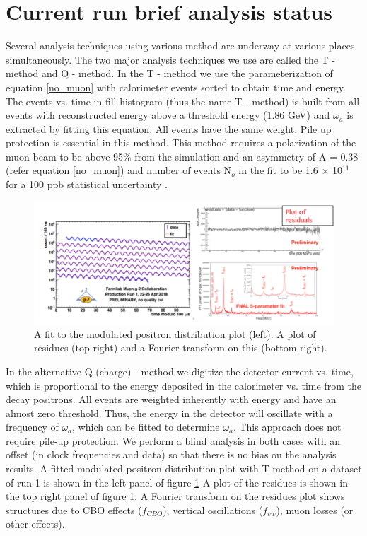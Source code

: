 \documentclass[journal,article,submit,moreauthors,pdftex,10pt,a4paper]{Definitions/mdpi}
\begin{document}
\section{Current run brief analysis status}
Several analysis techniques using various method are underway at various places simultaneously. 
The two major analysis techniques we use are called the T - method and Q - method. 
In the T - method we use the parameterization of equation \ref{no_muon} with calorimeter events 
sorted to obtain time and energy. The events vs. time-in-fill histogram (thus the name T - method) 
is built from all events with reconstructed energy above a threshold energy (1.86 GeV) and 
$\omega_a$ is extracted by fitting this equation. All events have the same weight. 
Pile up protection is essential in this method. 
This method requires a polarization of the muon beam to be above 95\% from the simulation 
and an asymmetry of A = 0.38 (refer equation \ref{no_muon}) and number of events N$_{o}$
in the fit to be 1.6 $\times$ 10$^{11}$ for a 100 ppb statistical uncertainty \cite{TDR}. 
\begin{figure}[H]
\centering
\includegraphics[width=13 cm]{analysis.png}
\caption{\label{fig10} A fit to the modulated positron distribution plot (left). A plot of residues (top right) and a Fourier transform on this (bottom right).}
\end{figure} 

In the alternative Q (charge) - method we digitize the detector current vs. time, 
which is proportional to the energy deposited in the calorimeter
vs. time from the decay positrons. All events are weighted inherently with energy 
and have an almost zero threshold. Thus, the energy in the detector will oscillate with a frequency of $\omega_a$, 
which can be fitted to determine $\omega_a$. This approach does not require pile-up protection. 
We perform a blind analysis in both cases with an offset (in clock frequencies and data) so that there 
is no bias on the analysis results. 
A fitted  modulated positron distribution plot with T-method on a dataset 
of run 1 is shown in the left panel of figure \ref{fig10} 
A plot of the residues is shown in the top right panel of figure \ref{fig10}. A Fourier transform on the residues 
plot shows structures due to CBO effects ($f_{CBO}$), vertical oscillations ($f_{vw}$), muon losses (or other effects). 
\end{document}
